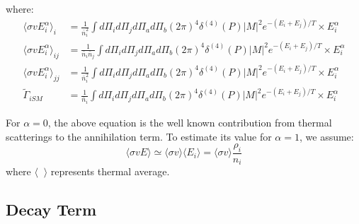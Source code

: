 \documentclass[preprint,notoc]{JHEP3}
\begin{document}
where:
\begin{eqnarray}
\langle \sigma v E_i^\alpha \rangle_i & =  \frac{1}{\bar{n}_i^2}\int  d\Pi_{i} d\Pi_{j} d\Pi_{a} d\Pi_{b} (2 \pi)^4 \delta^{(4)}(P) |M|^2 e^{-(E_i + E_j)/T} \times E_i^{\alpha} \\
\langle \sigma v E_i^\alpha \rangle_{ij} & =  \frac{1}{\bar{n}_i \bar{n}_j}\int  d\Pi_{i} d\Pi_{j} d\Pi_{a} d\Pi_{b} (2 \pi)^4 \delta^{(4)}(P) |M|^2 e^{-(E_i + E_j)/T} \times E_i^{\alpha} \\
\langle \sigma v E_i^\alpha \rangle_{jj} & =  \frac{1}{\bar{n}_i^2}\int  d\Pi_{i} d\Pi_{j} d\Pi_{a} d\Pi_{b} (2 \pi)^4 \delta^{(4)}(P) |M|^2 e^{-(E_i + E_j)/T} \times E_i^{\alpha} \\
\tilde{\Gamma}_{iSM} & =  \frac{1}{\bar{n}_i}\int  d\Pi_{i} d\Pi_{j} d\Pi_{a} d\Pi_{b} (2 \pi)^4 \delta^{(4)}(P) |M|^2 e^{-(E_i + E_j)/T} \times E_i^{\alpha} 
\end{eqnarray}

For $\alpha = 0$, the above equation is the well known contribution from thermal scatterings to the annihilation term. To estimate its value for $\alpha = 1$, we assume:
\begin{equation}
\langle \sigma v E \rangle \simeq \langle \sigma v \rangle \langle E_i \rangle = \langle \sigma v \rangle \frac{\rho_i}{n_i} \label{eq:app}
\end{equation}
where $\langle \;\; \rangle$ represents thermal average.


\subsection{Decay Term}
\end{document}
